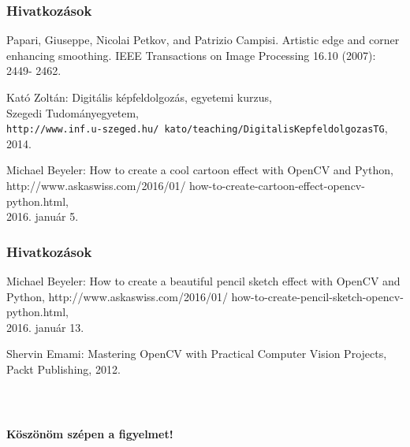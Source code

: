 \documentclass{beamer}
\begin{document}
\begin{frame}[fragile]
\frametitle{Hivatkozások}

\begin{thebibliography}{9}

Papari, Giuseppe, Nicolai Petkov, and Patrizio Campisi. Artistic edge and corner enhancing smoothing. IEEE Transactions on Image Processing 16.10 (2007): 2449- 2462.

\bigskip

Kató Zoltán: Digitális képfeldolgozás, egyetemi kurzus, \\
Szegedi Tudományegyetem, \\
\texttt{http://www.inf.u-szeged.hu/ kato/teaching/DigitalisKepfeldolgozasTG}, \\
2014.

\bigskip

Michael Beyeler: How to create a cool cartoon effect with OpenCV and Python, http://www.askaswiss.com/2016/01/ how-to-create-cartoon-effect-opencv-python.html, \\
2016. január 5.

\end{thebibliography}

\end{frame}

\begin{frame}[fragile]
\frametitle{Hivatkozások}

\begin{thebibliography}{9}

Michael Beyeler: How to create a beautiful pencil sketch effect with OpenCV and Python, http://www.askaswiss.com/2016/01/ how-to-create-pencil-sketch-opencv-python.html, \\
2016. január 13.

\bigskip

Shervin Emami: Mastering OpenCV with Practical Computer Vision Projects, Packt Publishing, 2012.

\end{thebibliography}

\end{frame}

\begin{frame}[fragile]
    \frametitle{\ }

\begin{center}
\Large \textbf{Köszönöm szépen a figyelmet!}
\end{center}

\end{frame}
\end{document}
